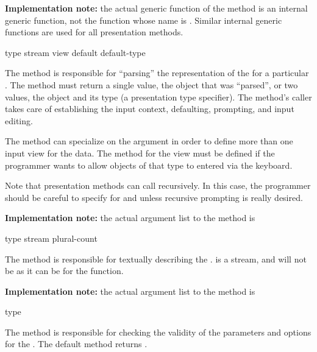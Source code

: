 {\bf Implementation note:} the actual generic function of the 
method is an internal generic function, not the function whose name is
.  Similar internal generic functions are used for all presentation
methods.


 {type stream view \key default default-type}

The  method is responsible for ``parsing'' the representation of the
  for a particular  .
The  method must return a single value, the object that was
``parsed'', or two values, the object and its type (a presentation type
specifier).  The method's caller takes care of establishing the input context,
defaulting, prompting, and input editing.

The  method can specialize on the  argument in order to
define more than one input view for the data.  The  method for the
 view must be defined if the programmer wants to allow objects
of that type to entered via the keyboard.

Note that  presentation methods can call  recursively.  In
this case, the programmer should be careful to specify  for 
and  unless recursive prompting is really desired.

{\bf Implementation note:} the actual argument list to the  method is
\\


 {type stream plural-count}

The  method is responsible for textually
describing the  .   is a stream,
and will not be  as it can be for the 
function.

{\bf Implementation note:} the actual argument list to the 
 method is
\\


 {type}

The  method is responsible for checking the
validity of the parameters and options for the 
.  The default method returns .

